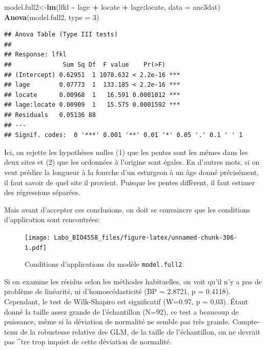 \documentclass[
  12pt,
]{book}
\newenvironment{Shaded}{\begin{snugshade}}{\end{snugshade}}
\newcommand{\DataTypeTok}[1]{\textcolor[rgb]{0.13,0.29,0.53}{#1}}
\newcommand{\DecValTok}[1]{\textcolor[rgb]{0.00,0.00,0.81}{#1}}
\newcommand{\KeywordTok}[1]{\textcolor[rgb]{0.13,0.29,0.53}{\textbf{#1}}}
\newcommand{\NormalTok}[1]{#1}
\newcommand{\OperatorTok}[1]{\textcolor[rgb]{0.81,0.36,0.00}{\textbf{#1}}}
\newcommand{\StringTok}[1]{\textcolor[rgb]{0.31,0.60,0.02}{#1}}
\begin{document}
\begin{Shaded}
\begin{Highlighting}[]
\NormalTok{model.full2\textless{}{-}}\KeywordTok{lm}\NormalTok{(lfkl }\OperatorTok{\textasciitilde{}}\StringTok{ }\NormalTok{lage }\OperatorTok{+}\StringTok{ }\NormalTok{locate }\OperatorTok{+}\StringTok{ }\NormalTok{lage}\OperatorTok{:}\NormalTok{locate, }\DataTypeTok{data =}\NormalTok{ anc3dat)}
\KeywordTok{Anova}\NormalTok{(model.full2, }\DataTypeTok{type =} \DecValTok{3}\NormalTok{)}
\end{Highlighting}
\end{Shaded}

\begin{verbatim}
## Anova Table (Type III tests)
## 
## Response: lfkl
##              Sum Sq Df  F value    Pr(>F)    
## (Intercept) 0.62951  1 1078.632 < 2.2e-16 ***
## lage        0.07773  1  133.185 < 2.2e-16 ***
## locate      0.00968  1   16.591 0.0001012 ***
## lage:locate 0.00909  1   15.575 0.0001592 ***
## Residuals   0.05136 88                       
## ---
## Signif. codes:  0 '***' 0.001 '**' 0.01 '*' 0.05 '.' 0.1 ' ' 1
\end{verbatim}

Ici, on rejette les hypothèses nulles (1) que les pentes sont les mêmes dans les deux sites et (2) que les ordonnées à l'origine sont égales. En d'autres mots, si on veut prédire la longueur à la fourche d'un esturgeon à un âge donné précisément, il faut savoir de quel site il provient. Puisque les pentes diffèrent, il faut estimer des régressions séparées.

Mais avant d'accepter ces conclusions, on doit se convaincre que les conditions d'application sont rencontrées:

\begin{figure}
\centering
\texttt{[image: Labo\_BIO4558\_files/figure-latex/unnamed-chunk-306-1.pdf]}
\caption{\label{fig:unnamed-chunk-306}Conditions d'applications du modèle \texttt{model.full2}}
\end{figure}

Si on examine les résidus selon les méthodes habituelles, on voit qu'il n'y a pas de problème de linéarité, ni d'homoscédasticité (BP = 2.8721, p = 0.4118). Cependant, le test de Wilk-Shapiro est significatif (W=0.97, p = 0.03). Étant donné la taille assez grande de l'échantillon (N=92), ce test a beaucoup de puissance, même si la déviation de normalité ne semble pas très grande. Compte-tenu de la robustesse relative des GLM, de la taille de l'échantillon, on ne devrait pas \^{}tre trop inquiet de cette déviation de normalité.
\end{document}
